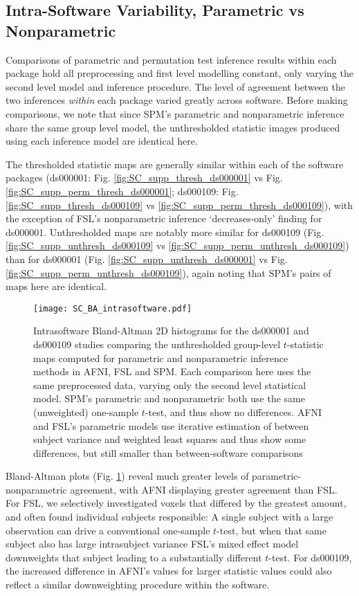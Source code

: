 \subsection{Intra-Software Variability, Parametric vs Nonparametric}

Comparisons of parametric and permutation test inference results within each package hold all preprocessing and first level modelling constant, only varying the second level model and inference procedure. The level of agreement between the two inferences \textit{within} each package varied greatly across software. Before making comparisons, we note that since SPM's parametric and nonparametric inference share the same group level model, the unthresholded statistic images produced using each inference model are identical here.

The thresholded statistic maps are generally similar within each of the software packages (ds000001: Fig. \ref{fig:SC_supp_thresh_ds000001} vs Fig. \ref{fig:SC_supp_perm_thresh_ds000001}; ds000109: Fig. \ref{fig:SC_supp_thresh_ds000109} vs \ref{fig:SC_supp_perm_thresh_ds000109}), with the exception of FSL's nonparametric inference `decreases-only' finding for ds000001. Unthresholded maps are notably more similar for ds000109 (Fig. \ref{fig:SC_supp_unthresh_ds000109} vs \ref{fig:SC_supp_perm_unthresh_ds000109}) than for ds000001 (Fig. \ref{fig:SC_supp_unthresh_ds000001} vs Fig. \ref{fig:SC_supp_perm_unthresh_ds000109}), again noting that SPM's pairs of maps here are identical. 

\begin{figure}[htbp]
\centering
	\texttt{[image: SC\_BA\_intrasoftware.pdf]}	
\caption{Intrasoftware Bland-Altman 2D histograms for the ds000001 and ds000109 studies comparing the unthresholded group-level $t$-statistic maps computed for parametric and nonparametric inference methods in AFNI, FSL and SPM. Each comparison here uses the same preprocessed data, varying only the second level statistical model. SPM's parametric and nonparametric both use the same (unweighted) one-sample $t$-test, and thus show no differences. AFNI and FSL's parametric models use iterative estimation of between subject variance and weighted least squares and thus show some differences, but still smaller than between-software comparisons}
\label{fig:BA_intrasoftware}
\end{figure}

Bland-Altman plots (Fig. \ref{fig:BA_intrasoftware}) reveal much greater levels of parametric-nonparametric agreement, with AFNI displaying greater agreement than FSL. For FSL, we selectively investigated voxels that differed by the greatest amount, and often found individual subjects responsible: A single subject with a large observation can drive a conventional one-sample $t$-test, but when that same subject also has large intrasubject variance FSL's mixed effect model downweights that subject leading to a substantially different $t$-test. For ds000109, the increased difference in AFNI's values for larger statistic values could also reflect a similar downweighting procedure within the software.

